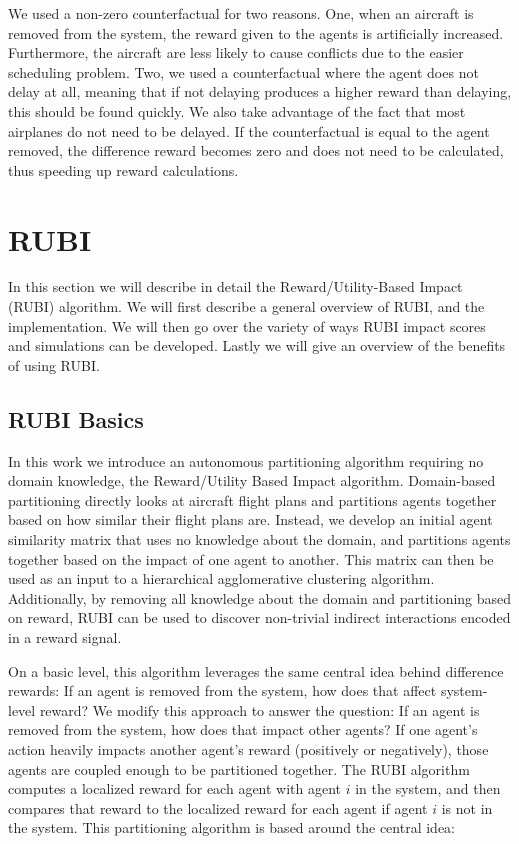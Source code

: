 \documentclass[letterpaper]{article}
\begin{document}
We used a non-zero counterfactual for two reasons. One, when an aircraft is removed from the system, the reward given to the agents is artificially increased. Furthermore, the aircraft are less likely to cause conflicts due to the easier scheduling problem. Two, we used a counterfactual where the agent does not delay at all, meaning that if not delaying produces a higher reward than delaying, this should be found quickly. We also take advantage of the fact that most airplanes do not need to be delayed. If the counterfactual is equal to the agent removed, the difference reward becomes zero and does not need to be calculated, thus speeding up reward calculations.

\section{RUBI}
In this section we will describe in detail the Reward/Utility-Based Impact (RUBI) algorithm. We will first describe a general overview of RUBI, and the implementation. We will then go over the variety of ways RUBI impact scores and simulations can be developed. Lastly we will give an overview of the benefits of using RUBI.

\subsection{RUBI Basics}
In this work we introduce an autonomous partitioning algorithm requiring no domain knowledge, the Reward/Utility Based Impact algorithm. Domain-based partitioning directly looks at aircraft flight plans and partitions agents together based on how similar their flight plans are. Instead, we develop an initial agent similarity matrix that uses no knowledge about the domain, and partitions agents together based on the impact of one agent to another. This matrix can then be used as an input to a hierarchical agglomerative clustering algorithm. Additionally, by removing all knowledge about the domain and partitioning based on reward, RUBI can be used to discover non-trivial indirect interactions encoded in a reward signal.

On a basic level, this algorithm leverages the same central idea behind difference rewards: If an agent is removed from the system, how does that affect system-level reward? We modify this approach to answer the question: If an agent is removed from the system, how does that impact other agents? If one agent's action heavily impacts another agent's reward (positively or negatively), those agents are coupled enough to be partitioned together. The RUBI algorithm computes a localized reward for each agent with agent $i$ in the system, and then compares that reward to the localized reward for each agent if agent $i$ is not in the system. This partitioning algorithm is based around the central idea:
\end{document}
